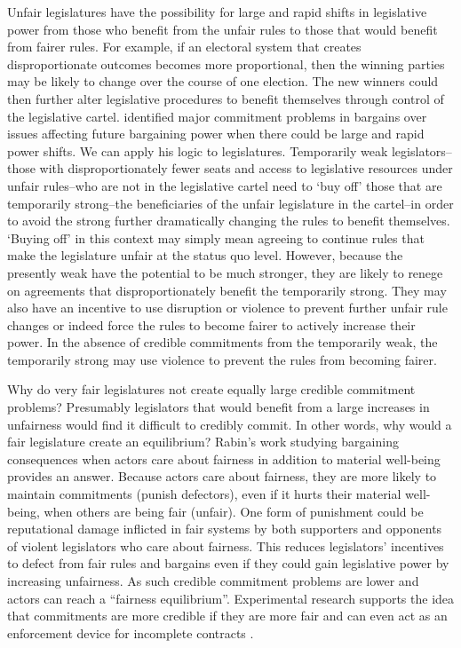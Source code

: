 \documentclass[a4paper]{article}\usepackage[]{graphicx}\usepackage[]{color}
\begin{document}
Unfair legislatures have the possibility for large and rapid shifts in legislative power from those who benefit from the unfair rules to those that would benefit from fairer rules. For example, if an electoral system that creates disproportionate outcomes becomes more proportional, then the winning parties may be likely to change over the course of one election. The new winners could then further alter legislative procedures to benefit themselves through control of the legislative cartel. \cite{Powell2004,Powell2006} identified major commitment problems in bargains over issues affecting future bargaining power when there could be large and rapid power shifts. We can apply his logic to legislatures. Temporarily weak legislators--those with disproportionately fewer seats and access to legislative resources under unfair rules--who are not in the legislative cartel need to `buy off' those that are temporarily strong--the beneficiaries of the unfair legislature in the cartel--in order to avoid the strong further dramatically changing the rules to benefit themselves. `Buying off' in this context may simply mean agreeing to continue rules that make the legislature unfair at the status quo level. However, because the presently weak have the potential to be much stronger, they are likely to renege on agreements that disproportionately benefit the temporarily strong. They may also have an incentive to use disruption or violence to prevent further unfair rule changes or indeed force the rules to become fairer to actively increase their power. In the absence of credible commitments from the temporarily weak, the temporarily strong may use violence to prevent the rules from becoming fairer.

Why do very fair legislatures not create equally large credible commitment problems? Presumably legislators that would benefit from a large increases in unfairness would find it difficult to credibly commit. In other words, why would a fair legislature create an equilibrium? Rabin's \citeyearpar{Rabin1993} work studying bargaining consequences when actors care about fairness in addition to material well-being provides an answer. Because actors care about fairness, they are more likely to maintain commitments (punish defectors), even if it hurts their material well-being, when others are being fair (unfair). One form of punishment could be reputational damage inflicted in fair systems by both supporters and opponents of violent legislators who care about fairness. This reduces legislators' incentives to defect from fair rules and bargains even if they could gain legislative power by increasing unfairness. As such credible commitment problems are lower and actors can reach a ``fairness equilibrium''. Experimental research supports the idea that commitments are more credible if they are more fair \citep{Ellingsen2004} and can even act as an enforcement device for incomplete contracts \citep[see][for a review]{Fehr2008}.  
\end{document}
